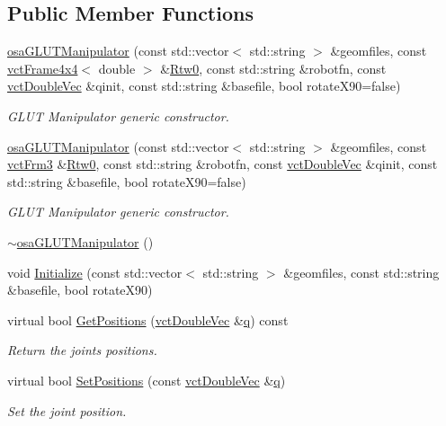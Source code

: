 \subsection*{Public Member Functions}
\begin{DoxyCompactItemize}
\item 
\hyperlink{classosa_g_l_u_t_manipulator_a5789dc8cc50d56e9fdf515bb56a7267a}{osa\-G\-L\-U\-T\-Manipulator} (const std\-::vector$<$ std\-::string $>$ \&geomfiles, const \hyperlink{classvct_frame4x4}{vct\-Frame4x4}$<$ double $>$ \&\hyperlink{classrob_manipulator_ab48d9d9a166bf252698bc35788ca6ad6}{Rtw0}, const std\-::string \&robotfn, const \hyperlink{vct_dynamic_vector_types_8h_ade4b3068c86fb88f41af2e5187e491c2}{vct\-Double\-Vec} \&qinit, const std\-::string \&basefile, bool rotate\-X90=false)
\begin{DoxyCompactList}\small\item\em G\-L\-U\-T Manipulator generic constructor. \end{DoxyCompactList}\item 
\hyperlink{classosa_g_l_u_t_manipulator_acee9eac89fd7f17ed04c3b4eaa77186b}{osa\-G\-L\-U\-T\-Manipulator} (const std\-::vector$<$ std\-::string $>$ \&geomfiles, const \hyperlink{vct_transformation_types_8h_a81feda0a02c2d1bc26e5553f409fed20}{vct\-Frm3} \&\hyperlink{classrob_manipulator_ab48d9d9a166bf252698bc35788ca6ad6}{Rtw0}, const std\-::string \&robotfn, const \hyperlink{vct_dynamic_vector_types_8h_ade4b3068c86fb88f41af2e5187e491c2}{vct\-Double\-Vec} \&qinit, const std\-::string \&basefile, bool rotate\-X90=false)
\begin{DoxyCompactList}\small\item\em G\-L\-U\-T Manipulator generic constructor. \end{DoxyCompactList}\item 
\hyperlink{classosa_g_l_u_t_manipulator_a59a1dcf9af4835767f8f4d162c6d5f49}{$\sim$osa\-G\-L\-U\-T\-Manipulator} ()
\item 
void \hyperlink{classosa_g_l_u_t_manipulator_a430da0b6621741e41f396bb0910988ba}{Initialize} (const std\-::vector$<$ std\-::string $>$ \&geomfiles, const std\-::string \&basefile, bool rotate\-X90)
\item 
virtual bool \hyperlink{classosa_g_l_u_t_manipulator_a7ac591a4bd3a3c85ca6e69f8c24af9b6}{Get\-Positions} (\hyperlink{vct_dynamic_vector_types_8h_ade4b3068c86fb88f41af2e5187e491c2}{vct\-Double\-Vec} \&\hyperlink{classosa_g_l_u_t_manipulator_aaa03cdd6825dd64f23586ab753579ffa}{q}) const 
\begin{DoxyCompactList}\small\item\em Return the joints positions. \end{DoxyCompactList}\item 
virtual bool \hyperlink{classosa_g_l_u_t_manipulator_aab0829d6d76165db89b2d8e0d50d5a4d}{Set\-Positions} (const \hyperlink{vct_dynamic_vector_types_8h_ade4b3068c86fb88f41af2e5187e491c2}{vct\-Double\-Vec} \&\hyperlink{classosa_g_l_u_t_manipulator_aaa03cdd6825dd64f23586ab753579ffa}{q})
\begin{DoxyCompactList}\small\item\em Set the joint position. \end{DoxyCompactList}\end{DoxyCompactItemize}
